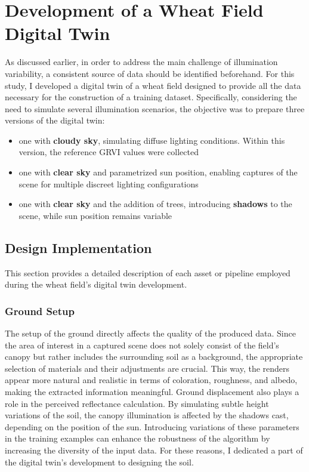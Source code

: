 \chapter{Development of a Wheat Field Digital Twin}
\label{chap4}

As discussed earlier, in order to address the main challenge of illumination variability, a consistent source of data should be identified beforehand. For this study, I developed a digital twin of a wheat field designed to provide all the data necessary for the construction of a training dataset. Specifically, considering the need to simulate several illumination scenarios, the objective was to prepare three versions of the digital twin:

\begin{itemize}
    \item one with \textbf{cloudy sky}, simulating diffuse lighting conditions. Within this version, the reference GRVI values were collected
    \item one with \textbf{clear sky} and parametrized sun position, enabling captures of the scene for multiple discreet lighting configurations
    \item one with \textbf{clear sky} and the addition of trees, introducing \textbf{shadows} to the scene, while sun position remains variable 
\end{itemize}


\section{Design Implementation}

This section provides a detailed description of each asset or pipeline employed during the wheat field's digital twin development.

\subsection{Ground Setup}
The setup of the ground directly affects the quality of the produced data. Since the area of interest in a captured scene does not solely consist of the field’s canopy but rather includes the surrounding soil as a background, the appropriate selection of materials and their adjustments are crucial. This way, the renders appear more natural and realistic in terms of coloration, roughness, and albedo, making the extracted information meaningful. Ground displacement also plays a role in the perceived reflectance calculation. By simulating subtle height variations of the soil, the canopy illumination is affected by the shadows cast, depending on the position of the sun. Introducing variations of these parameters in the training examples can enhance the robustness of the algorithm by increasing the diversity of the input data. For these reasons, I dedicated a part of the digital twin’s development to designing the soil.

